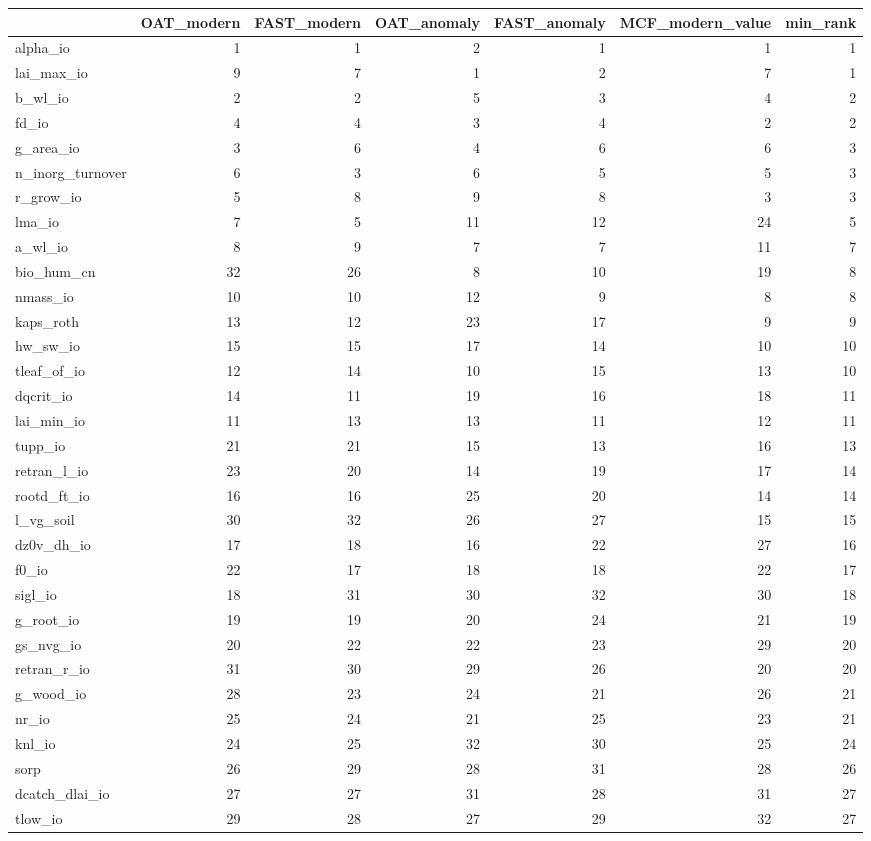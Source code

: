 \documentclass[gmd, manuscript]{copernicus}
\begin{document}
\begin{table}[ht]
\centering
\begin{tabular}{lrrrrrr}
  \hline
 & OAT\_modern & FAST\_modern & OAT\_anomaly & FAST\_anomaly & MCF\_modern\_value & min\_rank \\ 
  \hline
alpha\_io & 1 & 1 & 2 & 1 & 1 & 1 \\ 
  lai\_max\_io & 9 & 7 & 1 & 2 & 7 & 1 \\ 
  b\_wl\_io & 2 & 2 & 5 & 3 & 4 & 2 \\ 
  fd\_io & 4 & 4 & 3 & 4 & 2 & 2 \\ 
  g\_area\_io & 3 & 6 & 4 & 6 & 6 & 3 \\ 
  n\_inorg\_turnover & 6 & 3 & 6 & 5 & 5 & 3 \\ 
  r\_grow\_io & 5 & 8 & 9 & 8 & 3 & 3 \\ 
  lma\_io & 7 & 5 & 11 & 12 & 24 & 5 \\ 
  a\_wl\_io & 8 & 9 & 7 & 7 & 11 & 7 \\ 
  bio\_hum\_cn & 32 & 26 & 8 & 10 & 19 & 8 \\ 
  nmass\_io & 10 & 10 & 12 & 9 & 8 & 8 \\ 
  kaps\_roth & 13 & 12 & 23 & 17 & 9 & 9 \\ 
  hw\_sw\_io & 15 & 15 & 17 & 14 & 10 & 10 \\ 
  tleaf\_of\_io & 12 & 14 & 10 & 15 & 13 & 10 \\ 
  dqcrit\_io & 14 & 11 & 19 & 16 & 18 & 11 \\ 
  lai\_min\_io & 11 & 13 & 13 & 11 & 12 & 11 \\ 
  tupp\_io & 21 & 21 & 15 & 13 & 16 & 13 \\ 
  retran\_l\_io & 23 & 20 & 14 & 19 & 17 & 14 \\ 
  rootd\_ft\_io & 16 & 16 & 25 & 20 & 14 & 14 \\ 
  l\_vg\_soil & 30 & 32 & 26 & 27 & 15 & 15 \\ 
  dz0v\_dh\_io & 17 & 18 & 16 & 22 & 27 & 16 \\ 
  f0\_io & 22 & 17 & 18 & 18 & 22 & 17 \\ 
  sigl\_io & 18 & 31 & 30 & 32 & 30 & 18 \\ 
  g\_root\_io & 19 & 19 & 20 & 24 & 21 & 19 \\ 
  gs\_nvg\_io & 20 & 22 & 22 & 23 & 29 & 20 \\ 
  retran\_r\_io & 31 & 30 & 29 & 26 & 20 & 20 \\ 
  g\_wood\_io & 28 & 23 & 24 & 21 & 26 & 21 \\ 
  nr\_io & 25 & 24 & 21 & 25 & 23 & 21 \\ 
  knl\_io & 24 & 25 & 32 & 30 & 25 & 24 \\ 
  sorp & 26 & 29 & 28 & 31 & 28 & 26 \\ 
  dcatch\_dlai\_io & 27 & 27 & 31 & 28 & 31 & 27 \\ 
  tlow\_io & 29 & 28 & 27 & 29 & 32 & 27 \\ 
   \hline
   \end{tabular}
\belowtable{} %
\end{table}
\end{document}
